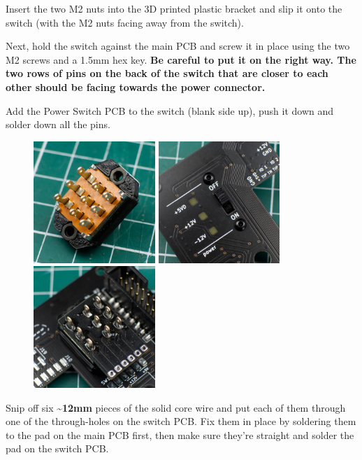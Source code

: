 \documentclass[12pt, a4paper]{article}
\begin{document}
Insert the two M2 nuts into the 3D printed plastic bracket and slip it onto the switch (with
the M2 nuts facing away from the switch).

Next, hold the switch against the main PCB and screw it in place using the two M2 screws and a
1.5mm hex key. \textbf{Be careful to put it on the right way. The two rows of pins on the back
of the switch that are closer to each other should be facing towards the power connector.}

Add the Power Switch PCB to the switch (blank side up), push it down and solder down all the
pins.

\begin{figure}[H]
    \centering
    \includegraphics[width=46mm]{images/section_3-1_bracket.jpg}
    \hspace{2mm}
    \includegraphics[width=46mm]{images/section_3-1_screwed.jpg}
    \hspace{2mm}
    \includegraphics[width=46mm]{images/section_3-1_soldered.jpg}
\end{figure}

Snip off six \textbf{\textasciitilde12mm} pieces of the solid core wire and put each of them through
one of the through-holes on the switch PCB. Fix them in place by soldering them to the pad
on the main PCB first, then make sure they're straight and solder the pad on the switch PCB.
\end{document}
